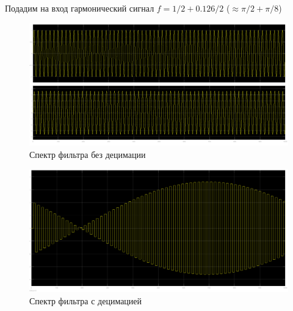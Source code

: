 \documentclass[12pt,a4paper]{article}
\begin{document}
	Подадим на вход гармонический сигнал $f = 1/2 + 0.126/2$ ($\approx \pi/2 + \pi/8$)
	\begin{figure}[H]
		\centering
		\includegraphics[width=1.0\linewidth]{res/4_4_inout_0126.png}
		\caption{Спектр фильтра без децимации}
	\end{figure}
	\begin{figure}[H]
		\centering
		\includegraphics[width=1.0\linewidth]{res/4_4_dcm_0126.png}
		\caption{Спектр фильтра с децимацией}
	\end{figure}
\end{document}
